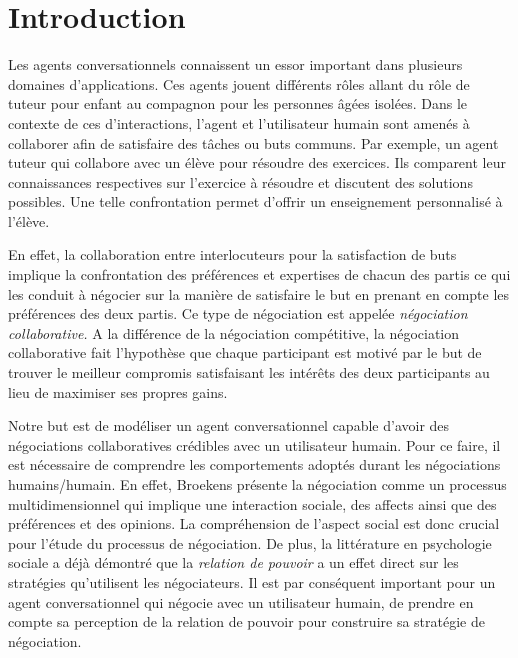 	\section{Introduction}
	Les agents conversationnels connaissent un essor important  dans plusieurs domaines d'applications. Ces agents jouent différents rôles allant du rôle de tuteur pour enfant au compagnon pour les personnes âgées isolées.
	Dans le contexte de ces d'interactions,  l'agent et l'utilisateur humain  sont amenés à collaborer afin de satisfaire des tâches ou buts communs. Par exemple, un agent tuteur qui collabore avec un élève pour résoudre des exercices. Ils comparent leur connaissances respectives sur l'exercice à résoudre et discutent des solutions possibles. Une telle confrontation  permet d'offrir un enseignement personnalisé à l'élève. 
	
	En effet, la collaboration entre interlocuteurs pour la satisfaction de buts implique la confrontation des préférences et expertises de chacun des partis ce qui les conduit à négocier sur la manière de satisfaire le but en prenant en compte les préférences des deux partis. Ce type de négociation est appelée \emph{négociation collaborative.} A la différence de la négociation compétitive, la négociation collaborative fait l'hypothèse que chaque participant est motivé par le but de trouver le meilleur compromis satisfaisant les intérêts des deux participants au lieu de maximiser ses propres gains.
	
	Notre but est de modéliser un agent conversationnel capable d'avoir des négociations collaboratives crédibles avec un utilisateur humain.
	Pour ce faire, il est nécessaire de comprendre les comportements adoptés durant les négociations humains/humain. En effet,  Broekens \cite{broekens2010affective} présente la négociation comme un processus multidimensionnel qui implique une interaction sociale, des affects ainsi que des préférences et des opinions. La compréhension de l'aspect social est donc crucial pour l'étude du processus de négociation.
	De plus, la littérature en psychologie sociale a déjà démontré que la \emph{relation de pouvoir} a un effet direct sur les stratégies qu'utilisent les négociateurs.
	Il est par conséquent important pour un agent conversationnel qui négocie avec un utilisateur humain, de prendre en compte sa perception de la relation de pouvoir pour construire sa stratégie de négociation.
	
